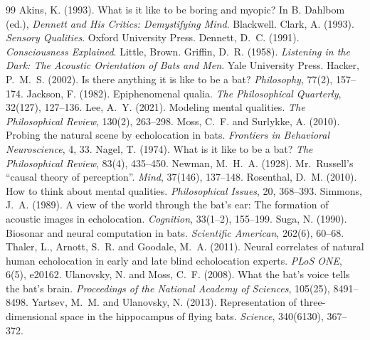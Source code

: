 \documentclass{situationist-preprint}
\begin{document}
\begin{thebibliography}{99}\small
{} Akins, K. (1993). What is it like to be boring and myopic? In B. Dahlbom (ed.), \emph{Dennett and His Critics: Demystifying Mind}. Blackwell.
 Clark, A. (1993). \emph{Sensory Qualities}. Oxford University Press.
 Dennett, D.~C. (1991). \emph{Consciousness Explained}. Little, Brown.
 Griffin, D.~R. (1958). \emph{Listening in the Dark: The Acoustic Orientation of Bats and Men}. Yale University Press.
 Hacker, P.~M.~S. (2002). Is there anything it is like to be a bat? \emph{Philosophy}, 77(2), 157--174.
 Jackson, F. (1982). Epiphenomenal qualia. \emph{The Philosophical Quarterly}, 32(127), 127--136.
 Lee, A.~Y. (2021). Modeling mental qualities. \emph{The Philosophical Review}, 130(2), 263--298.
 Moss, C.~F. and Surlykke, A. (2010). Probing the natural scene by echolocation in bats. \emph{Frontiers in Behavioral Neuroscience}, 4, 33.
 Nagel, T. (1974). What is it like to be a bat? \emph{The Philosophical Review}, 83(4), 435--450.
 Newman, M.~H.~A. (1928). Mr.\ Russell's \enquote{causal theory of perception}. \emph{Mind}, 37(146), 137--148.
 Rosenthal, D.~M. (2010). How to think about mental qualities. \emph{Philosophical Issues}, 20, 368--393.
 Simmons, J.~A. (1989). A view of the world through the bat's ear: The formation of acoustic images in echolocation. \emph{Cognition}, 33(1--2), 155--199.
 Suga, N. (1990). Biosonar and neural computation in bats. \emph{Scientific American}, 262(6), 60--68.
 Thaler, L., Arnott, S.~R. and Goodale, M.~A. (2011). Neural correlates of natural human echolocation in early and late blind echolocation experts. \emph{PLoS ONE}, 6(5), e20162.
 Ulanovsky, N. and Moss, C.~F. (2008). What the bat's voice tells the bat's brain. \emph{Proceedings of the National Academy of Sciences}, 105(25), 8491--8498.
 Yartsev, M.~M. and Ulanovsky, N. (2013). Representation of three-dimensional space in the hippocampus of flying bats. \emph{Science}, 340(6130), 367--372.
\end{thebibliography}
\end{document}
